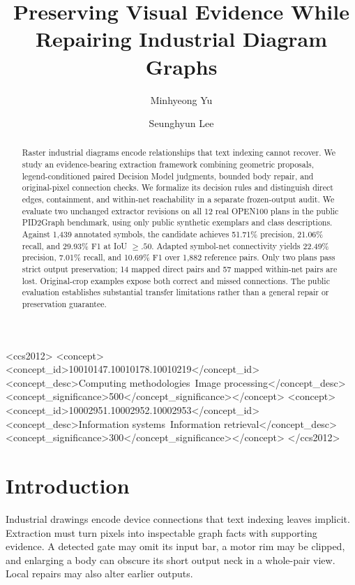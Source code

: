 \documentclass[sigconf,review]{acmart}
\title{Preserving Visual Evidence While Repairing Industrial Diagram Graphs}
\author{Minhyeong Yu}
\affiliation{\institution{Enhans}\city{}\country{}}
\author{Seunghyun Lee}
\affiliation{\institution{Enhans}\city{}\country{}}
\begin{document}
\begin{abstract}
Raster industrial diagrams encode relationships that text indexing cannot recover. We study an evidence-bearing extraction framework combining geometric proposals, legend-conditioned paired Decision Model judgments, bounded body repair, and original-pixel connection checks. We formalize its decision rules and distinguish direct edges, containment, and within-net reachability in a separate frozen-output audit. We evaluate two unchanged extractor revisions on all 12 real OPEN100 plans in the public PID2Graph benchmark, using only public synthetic exemplars and class descriptions. Against 1,439 annotated symbols, the candidate achieves 51.71\% precision, 21.06\% recall, and 29.93\% F1 at IoU $\ge .50$. Adapted symbol-net connectivity yields 22.49\% precision, 7.01\% recall, and 10.69\% F1 over 1,882 reference pairs. Only two plans pass strict output preservation; 14 mapped direct pairs and 57 mapped within-net pairs are lost. Original-crop examples expose both correct and missed connections. The public evaluation establishes substantial transfer limitations rather than a general repair or preservation guarantee.
\end{abstract}
\begin{CCSXML}
<ccs2012>
<concept><concept_id>10010147.10010178.10010219</concept_id><concept_desc>Computing methodologies~Image processing</concept_desc><concept_significance>500</concept_significance></concept>
<concept><concept_id>10002951.10002952.10002953</concept_id><concept_desc>Information systems~Information retrieval</concept_desc><concept_significance>300</concept_significance></concept>
</ccs2012>
\end{CCSXML}
\maketitle

\section{Introduction}
Industrial drawings encode device connections that text indexing leaves implicit. Extraction must turn pixels into inspectable graph facts with supporting evidence. A detected gate may omit its input bar, a motor rim may be clipped, and enlarging a body can obscure its short output neck in a whole-pair view. Local repairs may also alter earlier outputs.
\end{document}
